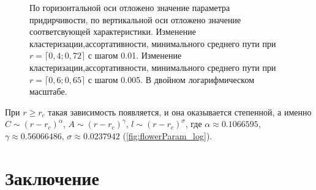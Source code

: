 \documentclass[10pt,aps,pra]{revtex4-1}
\begin{document}
\begin{figure}[H]  

\centering
{}  

\caption{
\label{fig:flowerParam}
По горизонтальной оси отложено значение параметра придирчивости, по вертикальной оси отложено значение соответсвующей характеристики.
 Изменение кластеризации,ассортативности, минимального среднего пути при $r=\lceil 0,4; 0,72 \rceil$ с шагом 0.01. 
 Изменение кластеризации,ассортативности, минимального среднего пути при $r=\lceil 0,6; 0,65 \rceil$ с шагом 0.005. В двойном логарифмическом масштабе.
}
\end{figure}

При $r \geq r_c$ такая зависимость появляется, и она оказывается степенной, а именно $C \sim {(r-r_c)}^\alpha$, $A \sim {(r-r_c)}^\gamma$, $l \sim {(r-r_c)}^\sigma$, где $\alpha \approx 0.1066595$, $\gamma \approx 0.56066486$, $\sigma \approx 0.0237942$ (\ref{fig:flowerParam_log}).

\section{Заключение}
\end{document}
